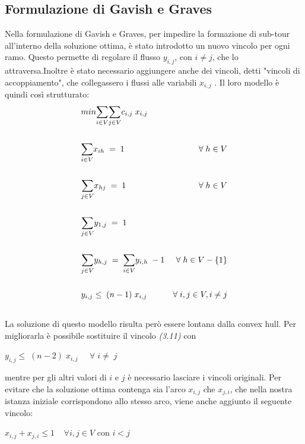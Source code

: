 \subsection{Formulazione di Gavish e Graves}
Nella formulazione di Gavish e Graves, per impedire la formazione di sub-tour all'interno della soluzione ottima, è stato introdotto un nuovo vincolo per ogni ramo. Questo permette di regolare il flusso $y_{i,j}$, con $i\neq j$,  che lo attraversa.Inoltre è stato necessario aggiungere anche dei vincoli, detti "vincoli di accoppiamento", che collegassero i flussi alle variabili $x_{i,j}$ . Il loro modello è quindi così strutturato:
\begin{align}
& min\underset{i\in V}\sum{\underset{j\in V}\sum{c_{i,j}\; x_{i,j}}} \\ \notag \\
& \underset{i\in V}\sum{x_{ih}}\;=\;1 & \forall\;h\in V \\ \notag\\
& \underset{j\in V}\sum{x_{hj}}\;=\;1 & \forall\;h\in V \\ \notag\\
& \underset{j\in V}\sum{y_{1,j}}\;=\;1\\ \notag\\
& \underset{j\in V}\sum{y_{h,j}}\;=\;\underset{i\in V}\sum{y_{i,h}}\;-1 & \forall\;h\in V-\{1\}\\ \notag\\
& y_{i,j}\leq\;(n-1)\;x_{i,j} & \forall\;i,j\in V, i\neq j\\ \notag
\end{align}
La soluzione di questo modello risulta però essere lontana dalla convex hull. Per migliorarla è possibile sostituire il vincolo \textit{(3.11)} con \\
\begin{center}
$y_{i,j}\leq\;(n-2)\;x_{i,j} \;\;\;\;\;\forall\; i\neq \; j$\\
\end{center}
mentre per gli altri valori di $i$ e $j$ è necessario lasciare i vincoli originali. 
Per evitare che la soluzione ottima contenga sia l'arco $x_{i,j}$ che $x_{j,i}$, che nella nostra istanza iniziale corrispondono allo stesso arco, viene anche aggiunto il seguente vincolo:
\begin{center}
$x_{i,j}+x_{j,i}\leq 1\;\;\;\; \forall i,j \in V$ con $i < j$
\end{center}

